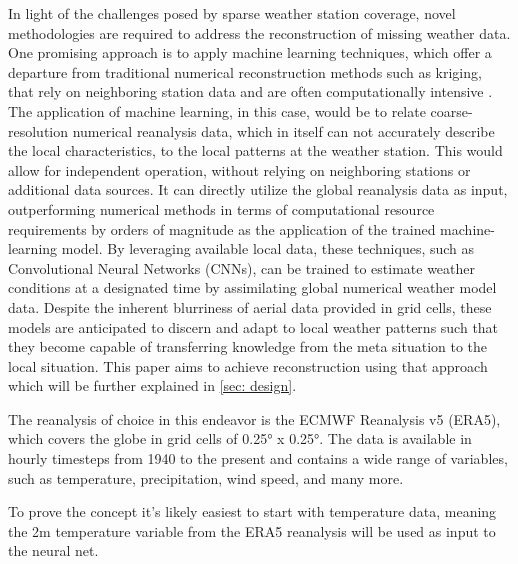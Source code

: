 In light of the challenges posed by sparse weather station coverage, novel methodologies are required to address the reconstruction of missing weather data. One promising approach is to apply machine learning techniques, which offer a departure from traditional numerical reconstruction methods such as kriging, that rely on neighboring station data and are often computationally intensive \cite{chung2019kriging}. The application of machine learning, in this case, would be to relate coarse-resolution numerical reanalysis data, which in itself can not accurately describe the local characteristics, to the local patterns at the weather station. This would allow for independent operation, without relying on neighboring stations or additional data sources. It can directly utilize the global reanalysis data as input, outperforming numerical methods in terms of computational resource requirements by orders of magnitude \cite{kurth2023MLperformance,bi2023MLperformance,lam2023MLperformance} as the application of the trained machine-learning model. By leveraging available local data, these techniques, such as Convolutional Neural Networks (CNNs), can be trained to estimate weather conditions at a designated time by assimilating global numerical weather model data. Despite the inherent blurriness of aerial data provided in grid cells, these models are anticipated to discern and adapt to local weather patterns such that they become capable of transferring knowledge from the meta situation to the local situation. This paper aims to achieve reconstruction using that approach which will be further explained in \autoref{sec: design}.


The reanalysis of choice in this endeavor is the ECMWF Reanalysis v5 (ERA5), which covers the globe in grid cells of 0.25° x 0.25°. The data is available in hourly timesteps from 1940 to the present and contains a wide range of variables, such as temperature, precipitation, wind speed, and many more. \cite{era5}


To prove the concept it's likely easiest to start with temperature data, meaning the 2m temperature variable from the ERA5 reanalysis will be used as input to the neural net.
